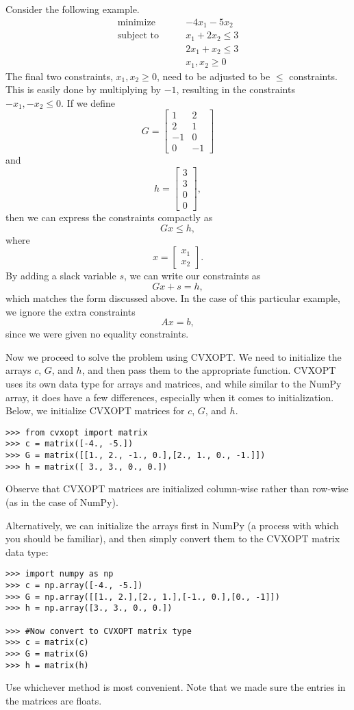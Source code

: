 Consider the following example.
\begin{align*}
\text{minimize}\qquad &-4x_1-5x_2 \\
\text{subject to}\qquad &x_1+2x_2 \leq 3 \\
	        &2x_1+x_2 \leq 3 \\
		&x_1, x_2 \geq 0
\end{align*}
The final two constraints, $x_1, x_2 \geq 0$, need to be adjusted to be $\leq$ constraints.
This is easily done by multiplying by $-1$, resulting in the constraints $-x_1, -x_2 \leq 0$.
If we define
\[
G = \begin{bmatrix}
  1 & 2\\
  2 & 1\\
  -1 & 0\\
  0 & -1
\end{bmatrix}
\]
and
\[
h = \begin{bmatrix}
  3\\
  3\\
  0\\
  0
\end{bmatrix},
\]
then we can express the constraints compactly as
\[
Gx \leq h,
\]
where
\[
x = \begin{bmatrix}
  x_1\\
  x_2
\end{bmatrix}.
\]
By adding a slack variable $s$, we can write our constraints as
\[
Gx + s = h,
\]
which matches the form discussed above. In the case of this particular example, we ignore the extra constraints
\[
Ax = b,
\]
since we were given no equality constraints.

Now we proceed to solve the problem using CVXOPT.
We need to initialize the arrays $c$, $G$, and $h$, and then pass them to the appropriate function.
CVXOPT uses its own data type for arrays and matrices, and while similar to the NumPy array, it
does have a few differences, especially when it comes to initialization.
Below, we initialize CVXOPT matrices for $c$, $G$, and $h$.

\begin{lstlisting}
>>> from cvxopt import matrix
>>> c = matrix([-4., -5.])
>>> G = matrix([[1., 2., -1., 0.],[2., 1., 0., -1.]])
>>> h = matrix([ 3., 3., 0., 0.])
\end{lstlisting}
Observe that CVXOPT matrices are initialized column-wise rather than row-wise (as in the case of NumPy).

Alternatively, we can initialize the arrays first in NumPy (a process with which you should be familiar),
and then simply convert them to the CVXOPT matrix data type:
\begin{lstlisting}
>>> import numpy as np
>>> c = np.array([-4., -5.])
>>> G = np.array([[1., 2.],[2., 1.],[-1., 0.],[0., -1]])
>>> h = np.array([3., 3., 0., 0.])

>>> #Now convert to CVXOPT matrix type
>>> c = matrix(c)
>>> G = matrix(G)
>>> h = matrix(h)
\end{lstlisting}
Use whichever method is most convenient. Note that we made sure the entries in the matrices are floats.


